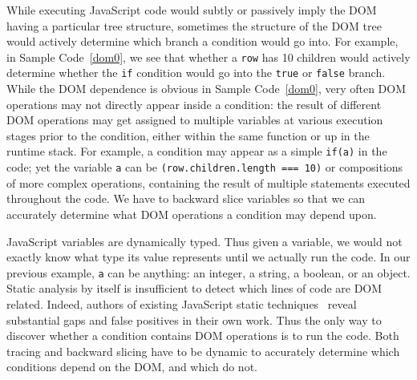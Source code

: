 While executing JavaScript code would subtly or passively imply the DOM having a particular tree structure, sometimes the structure of the DOM tree would actively determine which branch a condition would go into.  
For example, in Sample Code~\ref{dom0}, we see that whether a {\tt row} has 10 children would actively determine whether the {\tt if} condition would go into the {\tt true} or {\tt false} branch.
While the DOM dependence is obvious in Sample Code~\ref{dom0}, very often DOM operations may not directly appear inside a condition: 
the result of different DOM operations may get assigned to multiple variables at various execution stages prior to the condition, either within the same function or up in the runtime stack.  
For example, a condition may appear as a simple {\tt if(a)} in the code; yet the variable {\tt a} can be {\tt (row.children.length === 10)} or compositions of more complex operations, 
containing the result of multiple statements executed throughout the code.  
We have to backward slice variables so that we can accurately determine what DOM operations a condition may depend upon.  


JavaScript variables are dynamically typed.  Thus given a variable, we would not exactly know what type its value represents until we actually run the code.  
In our previous example, {\tt a} can be anything: an integer, a string, a boolean, or an object.  
Static analysis by itself is insufficient to detect which lines of code are DOM related.
Indeed, authors of existing JavaScript static techniques~\cite{staticJsWWW09, staticJsWWW11} reveal substantial gaps and false positives in their own work.  
Thus the only way to discover whether a condition contains DOM operations is to run the code.  
Both tracing and backward slicing have to be dynamic to accurately determine which conditions depend on the DOM, and which do not.  

